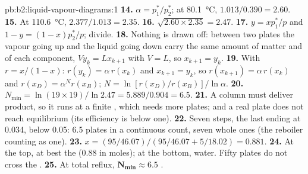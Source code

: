 \begin{solution}{pb:b2:liquid-vapour-diagrams:1}
\textbf{14.} $\alpha = p_1^*/p_2^*$; at \qty{80.1}{\degreeCelsius}, $1.013/0.390 =
2.60$.
\textbf{15.} At \qty{110.6}{\degreeCelsius}, $2.377/1.013 = 2.35$.
\textbf{16.} $\sqrt{2.60 \times 2.35} = 2.47$.
\textbf{17.} $y = xp_1^*/p$ and $1 - y = (1 - x)p_2^*/p$; divide.
\textbf{18.} Nothing is drawn off: between two plates the vapour going up and
the liquid going down carry the same amount of matter and of each component,
$V y_k = L x_{k+1}$ with $V = L$, so $x_{k+1} = y_k$.
\textbf{19.} With $r = x/(1 - x)$: $r(y_k) = \alpha\,r(x_k)$ and $x_{k+1} = y_k$, so
$r(x_{k+1}) = \alpha\,r(x_k)$ and $r(x_D) = \alpha^N r(x_B)$; $N = \ln[r(x_D)/
r(x_B)]/\ln\alpha$.
\textbf{20.} $N_{\min} = \ln(19 \times 19)/\ln 2.47 = 5.889/0.904 = 6.5$.
\textbf{21.} A column must deliver product, so it runs at a finite ,
which needs more plates; and a real plate does not reach equilibrium (its
efficiency is below one).
\textbf{22.} Seven steps, the last ending at 0.034, below 0.05: 6.5 plates in a
continuous count, seven whole ones (the reboiler counting as one).
\textbf{23.} $x = (95/46.07)/(95/46.07 + 5/18.02) = 0.881$.
\textbf{24.} At the top, at best the  (0.88 in moles); at the bottom,
water. Fifty plates do not cross the .
\textbf{25.} At total reflux, $\boldsymbol{N_{\min} \approx 6.5}$ .
\end{solution}
